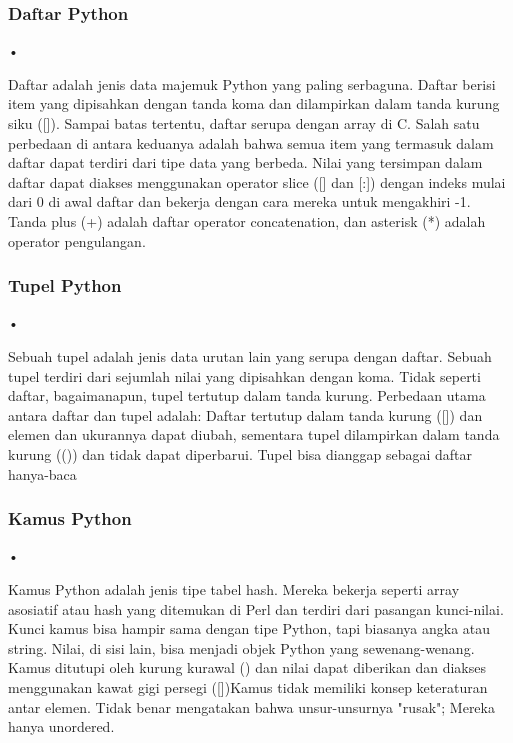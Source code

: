\documentclass{wileySix}
\begin{document}
\subsubsection{Daftar Python}
\begin{flushleft}
•
\end{flushleft}Daftar adalah jenis data majemuk Python yang paling serbaguna. Daftar berisi item yang dipisahkan dengan tanda koma dan dilampirkan dalam tanda kurung siku ([]). Sampai batas tertentu, daftar serupa dengan array di C. Salah satu perbedaan di antara keduanya adalah bahwa semua item yang termasuk dalam daftar dapat terdiri dari tipe data yang berbeda.
Nilai yang tersimpan dalam daftar dapat diakses menggunakan operator slice ([] dan [:]) dengan indeks mulai dari 0 di awal daftar dan bekerja dengan cara mereka untuk mengakhiri -1. Tanda plus (+) adalah daftar operator concatenation, dan asterisk (*) adalah operator pengulangan. 
\subsubsection{Tupel Python}
\begin{flushleft}
•
\end{flushleft}Sebuah tupel adalah jenis data urutan lain yang serupa dengan daftar. Sebuah tupel terdiri dari sejumlah nilai yang dipisahkan dengan koma. Tidak seperti daftar, bagaimanapun, tupel tertutup dalam tanda kurung.
Perbedaan utama antara daftar dan tupel adalah: Daftar tertutup dalam tanda kurung ([]) dan elemen dan ukurannya dapat diubah, sementara tupel dilampirkan dalam tanda kurung (()) dan tidak dapat diperbarui. Tupel bisa dianggap sebagai daftar hanya-baca 
\subsubsection{Kamus Python}
\begin{flushleft}
•
\end{flushleft}Kamus Python adalah jenis tipe tabel hash. Mereka bekerja seperti array asosiatif atau hash yang ditemukan di Perl dan terdiri dari pasangan kunci-nilai. Kunci kamus bisa hampir sama dengan tipe Python, tapi biasanya angka atau string. Nilai, di sisi lain, bisa menjadi objek Python yang sewenang-wenang.
Kamus ditutupi oleh kurung kurawal ({}) dan nilai dapat diberikan dan diakses menggunakan kawat gigi persegi ([])Kamus tidak memiliki konsep keteraturan antar elemen. Tidak benar mengatakan bahwa unsur-unsurnya "rusak"; Mereka hanya unordered.
\end{document}
